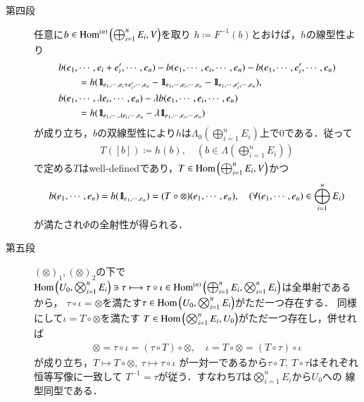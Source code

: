 \begin{prf}
\begin{description}
			\item[第四段]
				任意に$b \in \Ln{\bigoplus_{i=1}^n E_i}{V}{n}$を取り
				$h \coloneqq F^{-1}(b)$とおけば，$h$の線型性より
				\begin{align}
					&b(e_1,\cdots,e_i+e_i',\cdots,e_n) - b(e_1,\cdots,e_i,\cdots,e_n) - b(e_1,\cdots,e_i',\cdots,e_n) \\
					&\qquad = h(\defunc_{e_1,\cdots,e_i+e_i',\cdots,e_n} - \defunc_{e_1,\cdots,e_i,\cdots,e_n} - \defunc_{e_1,\cdots,e_i',\cdots,e_n}), \\
					&b(e_1,\cdots,\lambda e_i,\cdots,e_n) - \lambda b(e_1,\cdots,e_i,\cdots,e_n) \\
					&\qquad = h(\defunc_{e_1,\cdots,\lambda e_i,\cdots,e_n} - \lambda \defunc_{e_1,\cdots,e_i,\cdots,e_n})
				\end{align}
				が成り立ち，$b$の双線型性により$h$は$\Lambda_0(\bigoplus_{i=1}^n E_i)$上で0である．従って
				\begin{align}
					T([b]) \coloneqq h(b),
					\quad (b \in \Lambda(\bigoplus_{i=1}^n E_i))
				\end{align}
				で定める$T$はwell-definedであり，$T \in \Hom{\bigoplus_{i=1}^n E_i}{V}$かつ
				\begin{align}	
					b(e_1,\cdots,e_n) = h(\defunc_{e_1,\cdots,e_n}) = (T \circ \otimes) (e_1,\cdots,e_n),
					\quad (\forall (e_1,\cdots,e_n) \in \bigoplus_{i=1}^n E_i)
				\end{align}
				が満たされ$\Phi$の全射性が得られる．
				
			\item[第五段]
				$(\otimes)_1,(\otimes)_2$の下で
				$\Hom{U_0}{\bigotimes_{i=1}^n E_i} \ni \tau \longmapsto \tau \circ \iota \in \Ln{\bigoplus_{i=1}^n E_i}{\bigotimes_{i=1}^n E_i}{n}$は全単射であるから，
				$\tau \circ \iota = \otimes$を満たす$\tau \in \Hom{U_0}{\bigotimes_{i=1}^n E_i}$がただ一つ存在する．
				同様にして$\iota = T \circ \otimes$を満たす
				$T \in \Hom{\bigotimes_{i=1}^n E_i}{U_0}$がただ一つ存在し，併せれば
				\begin{align}
					\otimes = \tau \circ \iota = (\tau \circ T) \circ \otimes,
					\quad \iota = T \circ \otimes = (T \circ \tau) \circ \iota
				\end{align}
				が成り立ち，$T \longmapsto T \circ \otimes,\ \tau \longmapsto \tau \circ \iota$
				が一対一であるから$\tau \circ T,\ T \circ \tau$はそれぞれ恒等写像に一致して
				$T^{-1} = \tau$が従う．すなわち$T$は$\bigotimes_{i=1}^n E_i$から$U_0$への
				線型同型である．
				\QED
		\end{description}
	\end{prf}
	
